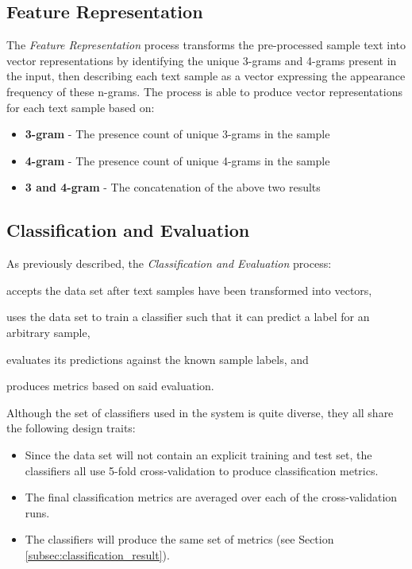 \documentclass[conference]{sig-alternate-05-2015}
\begin{document}
\subsection{Feature Representation}\label{subsec:feature_rep}
The \textit{Feature Representation} process transforms the pre-processed sample
text into vector representations by identifying the unique 3-grams and 4-grams
present in the input, then describing each text sample as a vector expressing
the appearance frequency of these n-grams. The process is able to produce
vector representations for each text sample based on:
\begin{itemize}
  \item \textbf{3-gram} - The presence count of unique 3-grams in the sample
  \item \textbf{4-gram} - The presence count of unique 4-grams in the sample
  \item \textbf{3 and 4-gram} - The concatenation of the above two results
\end{itemize}

\subsection{Classification and Evaluation}\label{subsec:classification}
As previously described, the \textit{Classification and Evaluation} process:
\begin{enumerate*}[(1)]
  \item accepts the data set after text samples have been transformed into
  vectors,
  \item uses the data set to train a classifier such that it can predict a label
  for an arbitrary sample,
  \item evaluates its predictions against the known sample labels, and
  \item produces metrics based on said evaluation.
\end{enumerate*}\par

Although the set of classifiers used in the system is quite diverse, they all
share the following design traits:
\begin{itemize}
  \item Since the data set will not contain an explicit training and test set,
  the classifiers all use 5-fold cross-validation to produce classification
  metrics.
  \item The final classification metrics are averaged over each of the
  cross-validation runs.
  \item The classifiers will produce the same set of metrics (see Section
  \ref{subsec:classification_result}).
\end{itemize}
\end{document}
